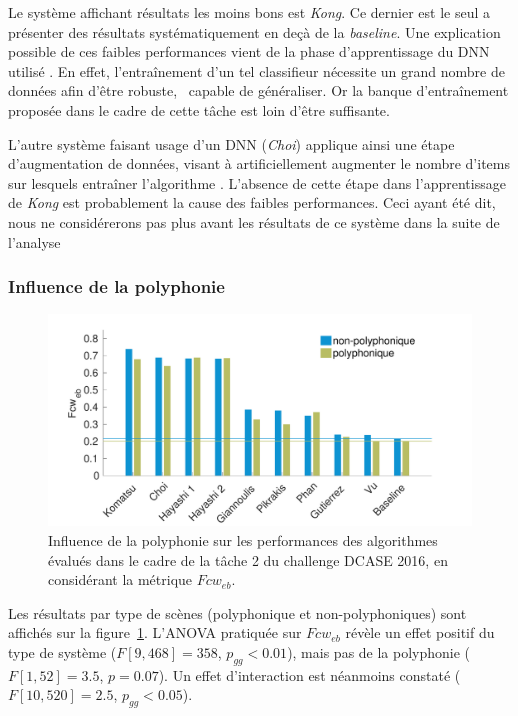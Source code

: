 Le système affichant résultats les moins bons est \emph{Kong}. Ce dernier est le seul a présenter des résultats systématiquement en deçà de la \emph{baseline}. Une explication possible de ces faibles performances vient de la phase d'apprentissage du DNN utilisé \citep{Kong2016}. En effet, l’entraînement d'un tel classifieur nécessite un grand nombre de données afin d'être robuste, \ie~capable de généraliser. Or la banque d'entraînement proposée dans le cadre de cette tâche est loin d'être suffisante. 

L'autre système faisant usage d'un DNN (\emph{Choi}) applique ainsi une étape d'augmentation de données, visant à artificiellement augmenter le nombre d'items sur lesquels entraîner l'algorithme \citep{Choi2016}. L'absence de cette étape dans l'apprentissage de \emph{Kong} est probablement la cause des faibles performances. Ceci ayant été dit, nous ne considérerons pas plus avant les résultats de ce système dans la suite de l'analyse

\subsubsection{Influence de la polyphonie}

\begin{figure}[t]
\includegraphics[width=1\textwidth]{gfx/ch_7/results_overall_poly_eb_class_wise_average_F_7}
\caption{Influence de la polyphonie sur les performances des algorithmes évalués dans le cadre de la tâche 2 du challenge DCASE 2016, en considérant la métrique $Fcw_{eb}$.}
\label{fig:overall_poly_eb_class_wise_F}
\end{figure}

Les résultats par type de scènes (polyphonique et non-polyphoniques) sont affichés sur la figure~\ref{fig:overall_poly_eb_class_wise_F}. L'ANOVA pratiquée sur $Fcw_{eb}$ révèle un effet positif du type de système ($F[9,468]=358$, $p_{gg}<0.01$), mais pas de la polyphonie ($F[1,52]=3.5$, $p=0.07$). Un effet d'interaction est néanmoins constaté ($F[10,520]=2.5$, $p_{gg}<0.05$).

